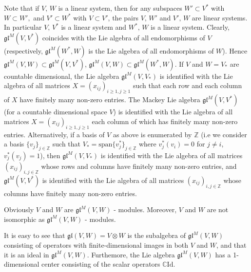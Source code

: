 \documentclass{svmult}
\newcommand {\ZZ} {\mathbb {Z}}
\newcommand {\CC} {\mathbb {C}}
\newcommand{\id}{\mathrm{Id}}
\renewcommand{\span}{\mathrm{span}}
\newcommand{\gl}{\mathfrak{gl}}
\begin{document}
Note that if $V,\,W$ is a linear system, then for any subspaces $W' \subset V^*$ with $W \subset W',$ and $V' \subset W^*$ with $V \subset V'$, the pairs $V,\,W'$ 
and $V',\,W$ are linear systems. In particular $V,\,V^*$ is a linear system and $W^*,\,W$ is a linear system. Clearly, $\gl^M(V,V^*)$ coincides with the Lie 
algebra of all endomorphisms of $V$ (respectively, $\gl^M(W^*,W)$ is the Lie algebra of all endomorphisms of $W$). Hence 
$\gl^M(V,W) \subset \gl^M(V,V^*)$, $\gl^M(V,W) \subset \gl^M(W^*,W)$.
If $V$ and $W = V_*$ are countable dimensional, the Lie algebra $\gl^M(V,V_*)$ is identified 
with the Lie algebra of all matrices $X=(x_{ij})_{i\geq 1, j\geq 1}$ such that each row and each column of $X$ have finitely many non-zero entries. 
The Mackey Lie algebra  $\gl^M(V,V^*)$
(for a countable dimensional space $V$) is identified with the Lie algebra of all matrices $X=(x_{ij})_{i\geq 1, j\geq 1}$ each column of which has finitely 
many non-zero entries. Alternatively, 
if a basis of $V$ as above is enumerated by $\ZZ$ (i.e we consider a basis $\lbrace v_j\rbrace_{j \in \ZZ}$ 
such that $V_* = \span \lbrace v^*_j \rbrace_{j \in \ZZ}$ 
where $v^*_j(v_i) = 0$ for $j \neq i$, $v_j^*(v_j)=1$), then  $\gl^M(V,V_*)$ is identified with the Lie algebra of all matrices $(x_{ij})_{i,j \in \ZZ}$ whose rows and 
columns have finitely many non-zero entries, and  $\gl^M(V,V^*)$ is identified with the Lie algebra of all matrices $(x_{ij})_{i,j\in \ZZ}$ whose columns have finitely 
many non-zero entries.

Obviously $V$ and $W$ are  $\gl^M(V,W)$ - modules. Moreover, $V$ and $W$ are not isomorphic as  $\gl^M(V,W)$ - modules.

It is easy to see that $\gl(V,W) = V \otimes W$ is the subalgebra of $\gl^M(V,W)$ consisting of operators with finite-dimensional images in both $V$ and $W$, and that it is an ideal in  $\gl^M(V,W)$. Furthemore, the Lie algebra  $\gl^M(V,W)$ has a 1-dimensional center consisting of 
the scalar operators $\CC \id$.
\end{document}
